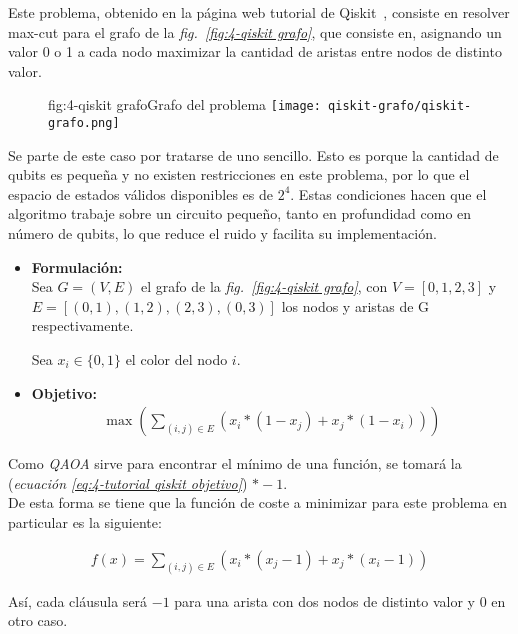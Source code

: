 Este problema, obtenido en la página web tutorial de Qiskit~\cite{qiskit_tutorial_antiguo}, consiste en resolver max-cut para el grafo de la \textit{fig.~\ref{fig:4-qiskit grafo}}, que consiste en, asignando un valor 0 o 1 a cada nodo maximizar la cantidad de aristas entre nodos de distinto valor.

\begin{figure}[Grafo {--} max-cut en grafo de 4 aristas]{fig:4-qiskit grafo}{Grafo del problema\cite{qiskit_tutorial_antiguo}}
  \centering
  \texttt{[image: qiskit-grafo/qiskit-grafo.png]}
\end{figure}

Se parte de este caso por tratarse de uno sencillo.
Esto es porque la cantidad de qubits es pequeña y no existen restricciones en este problema, por lo que el espacio de estados válidos disponibles es de $2^4$.
Estas condiciones hacen que el algoritmo trabaje sobre un circuito pequeño, tanto en profundidad como en número de qubits, lo que reduce el ruido y facilita su implementación. 

\begin{itemize}
\item \textbf{Formulación:} \\
  Sea $G = (V, E)$ el grafo de la \textit{fig.~\ref{fig:4-qiskit grafo}}, con $V = [0, 1, 2, 3]$ y $E = [(0, 1), (1, 2), (2, 3), (0, 3)]$ los nodos y aristas de G respectivamente.

  Sea $x_i \in \{0, 1\}$ el color del nodo $i$.

\item \textbf{Objetivo:} \\
  \begin{align}\label{eq:4-tutorial qiskit objetivo}
    \max(\sum_{(i, j) \in E} (x_i * (1 - x_j) + x_j * (1 - x_i)))
  \end{align}

\end{itemize}

Como \textit{QAOA} sirve para encontrar el mínimo de una función, se tomará la (\textit{ecuación \ref{eq:4-tutorial qiskit objetivo}}) $*-1$.
\\
De esta forma se tiene que la función de coste a minimizar para este problema en particular es la siguiente:

\begin{align}
  f(x) = \sum_{(i, j) \in E} (x_i * (x_j - 1) + x_j * (x_i - 1))
\end{align}

Así, cada cláusula será $-1$ para una arista con dos nodos de distinto valor y 0 en otro caso.

